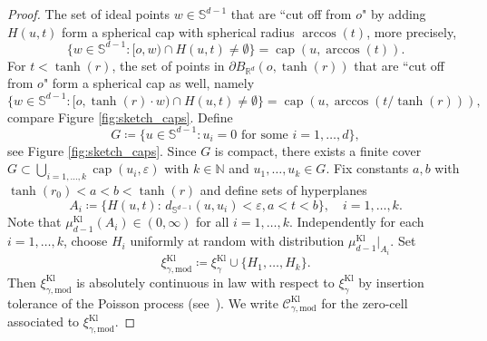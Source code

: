 \documentclass[12pt,a4paper]{article}
\theoremstyle{definition}
\newcommand{\N}{\mathbb{N}}
\newcommand{\R}{\mathbb{R}}
\DeclareMathOperator{\capop}{cap}
\begin{document}
\begin{proof}
The set of ideal points $w \in \mathbb{S}^{d-1}$ that are ``cut off from $o$" by adding $H(u,t)$ form a spherical cap with spherical radius $\arccos(t)$, more precisely,
    \begin{equation}\label{eq:cap_radius_1}
         \{w \in \mathbb{S}^{d-1} \colon [o,w) \cap H(u,t) \neq \emptyset\} = \capop(u,\arccos(t)).
    \end{equation}
    For $t < \tanh(r)$, the set of points in $\partial B_{\R^d}(o,\tanh(r))$ that are ``cut off from $o$" form a spherical cap as well, namely
    \begin{equation}\label{eq:cap_radius_r}
    \{w \in \mathbb{S}^{d-1} \colon [o,\tanh(r)\cdot w) \cap H(u,t) \neq \emptyset\} = \capop(u,\arccos({t}/{\tanh(r)})),
    \end{equation}
    compare Figure \ref{fig:sketch_caps}.
    Define
    \[ G \coloneqq \{u \in \mathbb{S}^{d-1} \colon \text{$u_i=0$ for some $i=1,\ldots,d$} \}, \]
    see Figure \ref{fig:sketch_caps}.
    Since $G$ is compact, there exists a finite cover $G \subset \bigcup_{i=1,\ldots,k} \capop(u_i,\varepsilon)$ with $k\in\N$ and $u_1,\ldots,u_k \in G$. Fix constants $a,b$ with $\tanh(r_0) < a < b < \tanh(r)$ and define sets of hyperplanes
    \[ A_i \coloneqq \{ H(u,t) \colon\, d_{\mathbb{S}^{d-1}}(u,u_i) < \varepsilon, a < t < b \}, \quad i=1,\ldots,k. \]
    Note that $\mu_{d-1}^\text{Kl}(A_i)\in(0,\infty)$ for all $i = 1,\ldots,k$.
    Independently for each $i = 1,\ldots,k$, choose $H_i$ uniformly at random with distribution $\mu_{d-1}^\text{Kl}|_{A_i}$.
    Set 
    $$
    \xi_{\gamma,\text{mod}}^\text{Kl}\coloneqq \xi_\gamma^\text{Kl} \cup \{H_1,\ldots,H_k\}.
    $$ 
    Then $\xi_{\gamma,\text{mod}}^\text{Kl}$ is absolutely continuous in law with respect to $\xi_\gamma^\text{Kl}$ by insertion tolerance of the Poisson process (see~\cite[Theorem 1.4 \& Remark 1.6]{HS13}). We write $\mathcal{C}_{\gamma,\text{mod}}^\text{Kl}$ for the zero-cell associated to $\xi_{\gamma,\text{mod}}^\text{Kl}$.


\end{proof}
\end{document}
